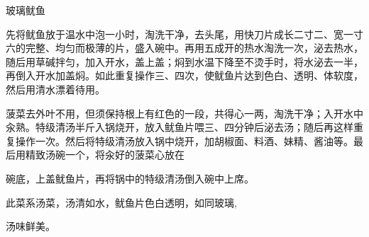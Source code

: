 \begin{recipe}{玻璃鱿鱼}

\ingredients


\cooking

\step 先将鱿鱼放于温水中泡一小时，淘洗干净，去头尾，用快刀片成长二寸二、宽一寸六的完整、均匀而极薄的片，盛入碗中。再用五成开的热水淘洗一次，泌去热水，随后用草碱拌匀，加入开水，盖上盖；焖到水温下降至不烫手时，将水泌去一半，再倒入开水加盖焖。如此重复操作三、四次，使鱿鱼片达到色白、透明、体软度，然后用清水漂着待用。

\step 菠菜去外叶不用，但须保持根上有红色的一段，共得心一两，淘洗干净；入开水中汆熟。特级清汤半斤入锅烧开，放入鱿鱼片喂三、四分钟后泌去汤；随后再这样重复操作一次。然后将特级清汤放入锅中烧开，加胡椒面、料酒、妹精、酱油等。最后用精致汤碗一个，将汆好的菠菜心放在

碗底，上盖鱿鱼片，再将锅中的特级清汤倒入碗中上席。

\notes

此菜系汤菜，汤清如水，鱿鱼片色白透明，如同玻璃,

汤味鲜美。

\end{recipe}

